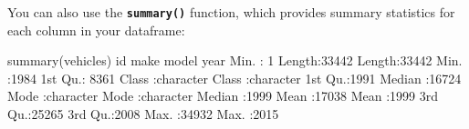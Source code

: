 \documentclass[
]{book}
\newenvironment{Shaded}{\begin{snugshade}}{\end{snugshade}}
\newcommand{\DecValTok}[1]{\textcolor[rgb]{0.00,0.00,0.81}{#1}}
\newcommand{\FunctionTok}[1]{\textcolor[rgb]{0.00,0.00,0.00}{#1}}
\newcommand{\NormalTok}[1]{#1}
\newcommand{\SpecialCharTok}[1]{\textcolor[rgb]{0.00,0.00,0.00}{#1}}
\newcommand{\StringTok}[1]{\textcolor[rgb]{0.31,0.60,0.02}{#1}}
\begin{document}
\begin{Shaded}
\end{Shaded}

You can also use the \textbf{\texttt{summary()}} function, which provides summary statistics for each column in your dataframe:

\begin{Shaded}
\begin{Highlighting}[]
\FunctionTok{summary}\NormalTok{(vehicles)}
\NormalTok{       id            make              model                year     }
\NormalTok{ Min.   }\SpecialCharTok{:}    \DecValTok{1}\NormalTok{   Length}\SpecialCharTok{:}\DecValTok{33442}\NormalTok{       Length}\SpecialCharTok{:}\DecValTok{33442}\NormalTok{       Min.   }\SpecialCharTok{:}\DecValTok{1984}  
\NormalTok{ 1st Qu.}\SpecialCharTok{:} \DecValTok{8361}\NormalTok{   Class }\SpecialCharTok{:}\NormalTok{character   Class }\SpecialCharTok{:}\NormalTok{character   1st Qu.}\SpecialCharTok{:}\DecValTok{1991}  
\NormalTok{ Median }\SpecialCharTok{:}\DecValTok{16724}\NormalTok{   Mode  }\SpecialCharTok{:}\NormalTok{character   Mode  }\SpecialCharTok{:}\NormalTok{character   Median }\SpecialCharTok{:}\DecValTok{1999}  
\NormalTok{ Mean   }\SpecialCharTok{:}\DecValTok{17038}\NormalTok{                                         Mean   }\SpecialCharTok{:}\DecValTok{1999}  
\NormalTok{ 3rd Qu.}\SpecialCharTok{:}\DecValTok{25265}\NormalTok{                                         3rd Qu.}\SpecialCharTok{:}\DecValTok{2008}  
\NormalTok{ Max.   }\SpecialCharTok{:}\DecValTok{34932}\NormalTok{                                         Max.   }\SpecialCharTok{:}\DecValTok{2015}  
                                                                     

\end{Highlighting}
\end{Shaded}
\end{document}
